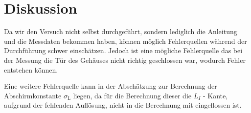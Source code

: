 \section{Diskussion}
Da wir den Versuch nicht selbst durchgeführt, sondern lediglich die Anleitung und die Messdaten bekommen haben, können möglich Fehlerquellen während der Durchführung schwer einschätzen. 
Jedoch ist eine mögliche Fehlerquelle das bei der Messung die Tür des Gehäuses nicht richtig geschlossen war, wodurch Fehler entstehen können.

\noindent
Eine weitere Fehlerquelle kann in der Abschätzung zur Berechnung der Abschirmkonstante $\sigma_\text{L}$ liegen, da für die Berechnung dieser die $L_I$ - Kante, aufgrund der fehlenden 
Auflösung, nicht in die Berechnung mit eingeflossen ist.
